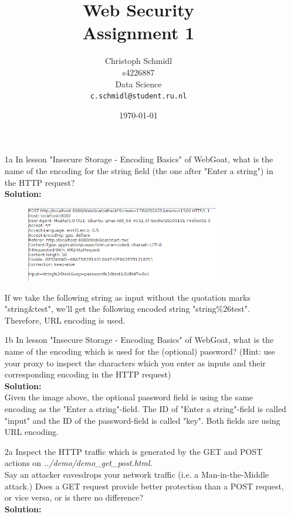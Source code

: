 \documentclass[a4paper]{article}
\title{Web Security\\Assignment 1}
\author{
  Christoph Schmidl\\ s4226887\\ Data Science\\      \texttt{c.schmidl@student.ru.nl}
}
\date{\today}
\begin{document}
\maketitle

\begin{enumerate}
	\item[1a] In lesson "Insecure Storage - Encoding Basics" of WebGoat, what is the name of the encoding for the string field (the one after "Enter a string") in the HTTP request?\\
	\textbf{Solution:}\\
	
		\begin{figure}[H]
	    \centering
  	    \includegraphics[width=0.8\textwidth]{img/encoding.PNG}
	    \end{figure}	
	    
	 If we take the following string as input without the quotation marks "string\&test", we'll get the following encoded string "string\%26test". Therefore, URL encoding is used.
	
	\item[1b] In lesson "Insecure Storage - Encoding Basics" of WebGoat, what is the name of the encoding which is used for the (optional) password? (Hint: use your proxy to inspect the characters which you enter as inputs and their corresponding encoding in the HTTP request)\\
	\textbf{Solution:}\\
	
	Given the image above, the optional password field is using the same encoding as the "Enter a string"-field. The ID of "Enter a string"-field is called "input" and the ID of the password-field is called "key". Both fields are using URL encoding.\\
	
	\item[2a] Inspect the HTTP traffic which is generated by the GET and POST actions on \textit{../demo/demo\_get\_post.html}.\\
	Say an attacker eavesdrops your network traffic (i.e. a Man-in-the-Middle attack.) Does a GET request provide better protection than a POST request, or vice versa, or is there no difference?\\
	\textbf{Solution:}\\
	

\end{enumerate}
\end{document}
